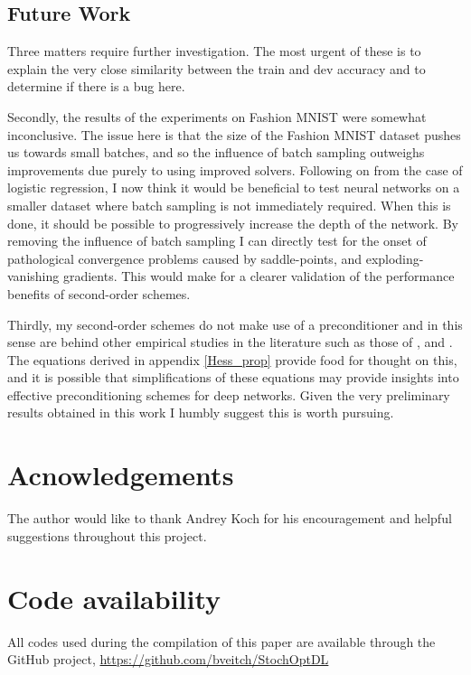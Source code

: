 \documentclass[11pt,twocolumn]{article}
\begin{document}
\subsection{Future Work}
Three matters require further investigation. The most urgent of these is to explain the very close similarity between the train and dev accuracy and to determine if there is a bug here. 

Secondly, the results of the experiments on Fashion MNIST were somewhat inconclusive. The issue here is that the size of the Fashion MNIST dataset pushes us towards small batches, and so the influence of batch sampling outweighs improvements due purely to using improved solvers. Following on from the case of logistic regression, I now think it would be beneficial to test neural networks on a smaller dataset where batch sampling is not immediately required. When this is done, it should be possible to progressively increase the depth of the network. By removing the influence of batch sampling I can directly test for the onset of pathological convergence problems caused by saddle-points, and exploding-vanishing gradients. This would make for a clearer validation of the performance benefits of second-order schemes. 

Thirdly, my second-order schemes do not make use of a preconditioner and in this sense are behind other empirical studies in the literature such as those of \citet{Martens:Deep}, \citet{Xu:2ndNCML} and \citet{Asi:BetterStoch}. The equations derived in appendix \ref{Hess_prop} provide food for thought on this, and it is possible that simplifications of these equations may provide insights into effective preconditioning schemes for deep networks. Given the very preliminary results obtained in this work I humbly suggest this is worth pursuing. 

\section*{Acnowledgements}
The author would like to thank Andrey Koch for his encouragement and helpful suggestions throughout this project.

\section*{Code availability}
All codes used during the compilation of this paper are available through the GitHub project, \url{https://github.com/bveitch/StochOptDL}

\newpage
  
\end{document}
